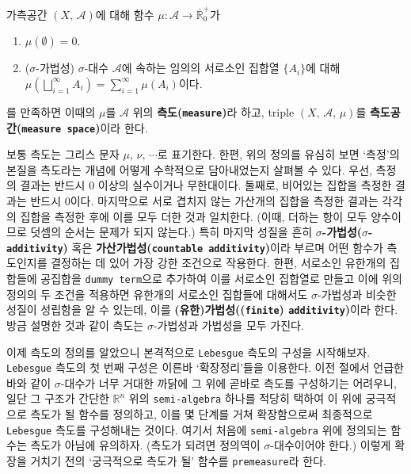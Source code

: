 \begin{definition}
    가측공간 $(X,\,\mathcal{A})$에 대해 함수 $\mu:\mathcal{A}\to\overline{\mathbb{R}}^+_0$가
    \begin{enumerate}
        \item $\mu(\emptyset)=0$.
        \item ($\sigma$-가법성) $\sigma$-대수 $\mathcal{A}$에 속하는 임의의 서로소인 집합열 $\{A_i\}$에 대해 $\mu(\bigsqcup_{i=1}^\infty A_i)=\sum_{i=1}^\infty\mu(A_i)$이다.
    \end{enumerate}
    를 만족하면 이때의 $\mu$를 $\mathcal{A}$ 위의 \textbf{측도(\texttt{measure})}라 하고, triple $(X,\,\mathcal{A},\,\mu)$를 \textbf{측도공간(\texttt{measure space})}이라 한다.
\end{definition}

보통 측도는 그리스 문자 $\mu,\,\nu,\,\cdots$로 표기한다. 한편, 위의 정의를 유심히 보면 `측정'의 본질을 측도라는 개념에 어떻게 수학적으로 담아내었는지 살펴볼 수 있다. 우선, 측정의 결과는 반드시 0 이상의 실수이거나 무한대이다. 둘째로, 비어있는 집합을 측정한 결과는 반드시 0이다. 마지막으로 서로 겹치지 않는 가산개의 집합을 측정한 결과는 각각의 집합을 측정한 후에 이를 모두 더한 것과 일치한다. (이때, 더하는 항이 모두 양수이므로 덧셈의 순서는 문제가 되지 않는다.) 특히 마지막 성질을 흔히 \textbf{$\sigma$-가법성($\sigma$-\texttt{additivity})} 혹은 \textbf{가산가법성(\texttt{countable additivity})}이라 부르며 어떤 함수가 측도인지를 결정하는 데 있어 가장 강한 조건으로 작용한다. 한편, 서로소인 유한개의 집합들에 공집합을 \texttt{dummy term}으로 추가하여 이를 서로소인 집합열로 만들고 이에 위의 정의의 두 조건을 적용하면 유한개의 서로소인 집합들에 대해서도 $\sigma$-가법성과 비슷한 성질이 성립함을 알 수 있는데, 이를 \textbf{(유한)가법성((\texttt{finite}) \texttt{additivity})}이라 한다. 방금 설명한 것과 같이 측도는 $\sigma$-가법성과 가법성을 모두 가진다.

이제 측도의 정의를 알았으니 본격적으로 \texttt{Lebesgue} 측도의 구성을 시작해보자. \texttt{Lebesgue} 측도의 첫 번째 구성은 이른바 `확장정리'들을 이용한다. 이전 절에서 언급한 바와 같이 $\sigma$-대수가 너무 거대한 까닭에 그 위에 곧바로 측도를 구성하기는 어려우니, 일단 그 구조가 간단한 $\mathbb{R}^n$ 위의 \texttt{semi-algebra} 하나를 적당히 택하여 이 위에 궁극적으로 측도가 될 함수를 정의하고, 이를 몇 단계를 거쳐 확장함으로써 최종적으로 \texttt{Lebesgue} 측도를 구성해내는 것이다. 여기서 처음에 \texttt{semi-algebra} 위에 정의되는 함수는 측도가 아님에 유의하자. (측도가 되려면 정의역이 $\sigma$-대수이어야 한다.) 이렇게 확장을 거치기 전의 `궁극적으로 측도가 될' 함수를 \texttt{premeasure}라 한다.


